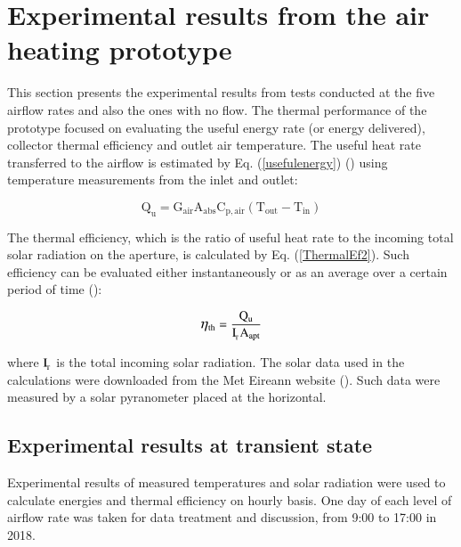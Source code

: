 

\section{Experimental results from the air heating prototype}

This section presents the experimental results from tests conducted at the five airflow rates and also the ones with no flow. The thermal performance of the prototype focused on evaluating the useful energy rate (or energy delivered), collector thermal efficiency and outlet air temperature. The useful heat rate transferred to the airflow is estimated by Eq. (\ref{usefulenergy}) (\cite{Kalogirou2004}) using temperature measurements from the inlet and outlet:

\vspace{-0.75cm}
\begin{equation}
\mathrm{{Q_u} = {G_{air}}{A_{abs}}{C_{p,air}}({T_{out}} - {T_{in}})}
\label{usefulenergy}
\end{equation}

The thermal efficiency, which is the ratio of useful heat rate to the incoming total solar radiation on the aperture, is calculated by Eq. (\ref{ThermalEf2}). Such efficiency can be evaluated either instantaneously or as an average over a certain period of time (\cite{Goswami2015}):

\vspace{-0.75cm}
\begin{equation}
\mathrm{\mathlarger{\eta}_{\mathrm{th}} = \frac{Q_u}{I_{\!_T}A_{apt}}}
\label{ThermalEf2}
\end{equation}

\noindent where $\rm{I_{\!_T}}$ is the total incoming solar radiation. The solar data used in the calculations were downloaded from the Met Eireann website (\cite{MetEireann2018}). Such data were measured by a solar pyranometer placed at the horizontal.

\subsection{Experimental results at transient state}

Experimental results of measured temperatures and solar radiation were used to calculate energies and thermal efficiency on hourly basis. One day of each level of airflow rate was taken for data treatment and discussion, from 9:00 to 17:00 in 2018.

